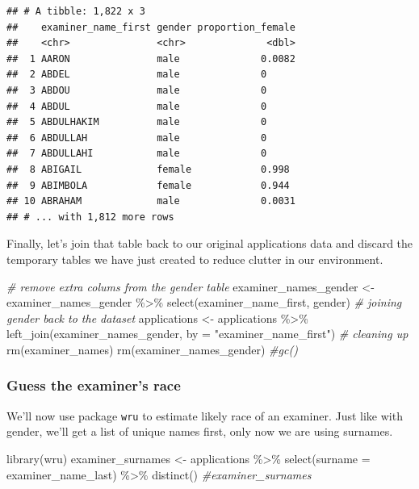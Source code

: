 \documentclass[
]{article}
\newenvironment{Shaded}{\begin{snugshade}}{\end{snugshade}}
\newcommand{\AttributeTok}[1]{\textcolor[rgb]{0.77,0.63,0.00}{#1}}
\newcommand{\CommentTok}[1]{\textcolor[rgb]{0.56,0.35,0.01}{\textit{#1}}}
\newcommand{\FunctionTok}[1]{\textcolor[rgb]{0.00,0.00,0.00}{#1}}
\newcommand{\NormalTok}[1]{#1}
\newcommand{\OtherTok}[1]{\textcolor[rgb]{0.56,0.35,0.01}{#1}}
\newcommand{\SpecialCharTok}[1]{\textcolor[rgb]{0.00,0.00,0.00}{#1}}
\newcommand{\StringTok}[1]{\textcolor[rgb]{0.31,0.60,0.02}{#1}}
\begin{document}
\begin{verbatim}
## # A tibble: 1,822 x 3
##    examiner_name_first gender proportion_female
##    <chr>               <chr>              <dbl>
##  1 AARON               male              0.0082
##  2 ABDEL               male              0     
##  3 ABDOU               male              0     
##  4 ABDUL               male              0     
##  5 ABDULHAKIM          male              0     
##  6 ABDULLAH            male              0     
##  7 ABDULLAHI           male              0     
##  8 ABIGAIL             female            0.998 
##  9 ABIMBOLA            female            0.944 
## 10 ABRAHAM             male              0.0031
## # ... with 1,812 more rows
\end{verbatim}

Finally, let's join that table back to our original applications data
and discard the temporary tables we have just created to reduce clutter
in our environment.

\begin{Shaded}
\begin{Highlighting}[]
\CommentTok{\# remove extra colums from the gender table}
\NormalTok{examiner\_names\_gender }\OtherTok{\textless{}{-}}\NormalTok{ examiner\_names\_gender }\SpecialCharTok{\%\textgreater{}\%} 
  \FunctionTok{select}\NormalTok{(examiner\_name\_first, gender)}
\CommentTok{\# joining gender back to the dataset}
\NormalTok{applications }\OtherTok{\textless{}{-}}\NormalTok{ applications }\SpecialCharTok{\%\textgreater{}\%} 
  \FunctionTok{left\_join}\NormalTok{(examiner\_names\_gender, }\AttributeTok{by =} \StringTok{"examiner\_name\_first"}\NormalTok{)}
\CommentTok{\# cleaning up}
\FunctionTok{rm}\NormalTok{(examiner\_names)}
\FunctionTok{rm}\NormalTok{(examiner\_names\_gender)}
\CommentTok{\#gc()}
\end{Highlighting}
\end{Shaded}

\hypertarget{guess-the-examiners-race}{%
\subsubsection{Guess the examiner's
race}\label{guess-the-examiners-race}}

We'll now use package \texttt{wru} to estimate likely race of an
examiner. Just like with gender, we'll get a list of unique names first,
only now we are using surnames.

\begin{Shaded}
\begin{Highlighting}[]
\FunctionTok{library}\NormalTok{(wru)}
\NormalTok{examiner\_surnames }\OtherTok{\textless{}{-}}\NormalTok{ applications }\SpecialCharTok{\%\textgreater{}\%} 
  \FunctionTok{select}\NormalTok{(}\AttributeTok{surname =}\NormalTok{ examiner\_name\_last) }\SpecialCharTok{\%\textgreater{}\%} 
  \FunctionTok{distinct}\NormalTok{()}
\CommentTok{\#examiner\_surnames}
\end{Highlighting}
\end{Shaded}
\end{document}

